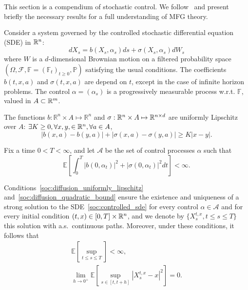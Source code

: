 This section is a compendium of stochastic control.
We follow~\cite{pham2009continuous} and present briefly the necessary results
for a full understanding of MFG theory.

Consider a system governed by the controlled
stochastic differential equation (SDE) in $\mathbb{R}^n$:
\begin{equation}\label{soc:controlled_sde}
    d X_s = b(X_s, \alpha_s)ds + \sigma(X_s, \alpha_s) d W_s
\end{equation}
where $W$ is a $d$-dimensional Brownian motion on a filtered probability space
$(\Omega, \mathcal{F}, \mathbb{F} = {(\mathbb{F}_t)}_{t \geq 0}, \mathbb{P} )$ satisfying the
usual conditions.
The coefficients $b(t,x,a)$ and $\sigma(t,x,a)$ are depend on $t$, except
in the case of infinite horizon problems.
The control $\alpha = (\alpha_s)$ is a progressively measurable process w.r.t.
$\mathbb{F}$, valued in $A \subset \mathbb{R}^m$.

The functions $b: \mathbb{R}^n \times A \mapsto \mathbb{R}^n$ and 
$\sigma: \mathbb{R}^n \times A \mapsto \mathbb{R}^{n\times d}$ are uniformly
Lipschitz over $A$: $\exists K \geq 0, \forall x,y, \in \mathbb{R}^n, \forall a \in A$,
\begin{equation}\label{soc:diffusion_uniformly_lipschitz}
    | b(x,a) - b(y,a) | + | \sigma(x,a) - \sigma(y,a) | \geq K | x - y |.   
\end{equation}

Fix a time $0 < T < \infty$, and let $\mathcal{A}$ be the set of control processes
$\alpha$ such that
\begin{equation}\label{soc:diffusion_quadratic_bound}
    \mathbb{E}\left[ \int^T_0 |b( 0,\alpha_t )|^2 + |\sigma( 0, \alpha_t )|^2 dt \right] < \infty.
\end{equation}

Conditions~\eqref{soc:diffusion_uniformly_lipschitz} 
and~\eqref{soc:diffusion_quadratic_bound} ensure the existence and uniqueness
of a strong solution to the SDE~\eqref{soc:controlled_sde}
for every control $\alpha \in \mathcal{A}$ and for every initial condition
$(t,x) \in [0,T] \times \mathbb{R}^n$, and we denote by $\{ X_s^{t,x}, t \leq s \leq T \}$
this solution with a.s.\ continuous paths. Moreover, under these conditions,
it follows that
    \begin{gather}
        \mathbb{E} \left[ \sup\limits_{t\leq s \leq T} \right] < \infty,\\
        \lim_{h \to 0^+} \mathbb{E} \left[ \sup\limits_{s\in [t,t+h]} | X_s^{t,x} - x |^2 \right] = 0.
    \end{gather}

